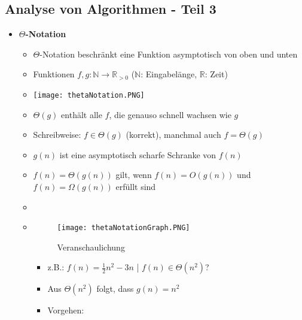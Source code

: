\subsection{Analyse von Algorithmen - Teil 3}
    \begin{itemize}
        \item \textbf{$\Theta$-Notation}
            \begin{itemize}
                \item $\Theta$-Notation beschränkt eine Funktion asymptotisch von oben und unten
                \item Funktionen $f,g: \mathbb{N} \rightarrow \mathbb{R}_{>0}$ ($\mathbb{N}$: Eingabelänge, $\mathbb{R}$: Zeit)
                \item[] \texttt{[image: thetaNotation.PNG]}
                \item $\Theta(g)$ enthält alle $f$, die genauso schnell wachsen wie $g$
                \item Schreibweise: $f \in \Theta(g)$ (korrekt), manchmal auch $f = \Theta(g)$
                \item $g(n)$ ist eine asymptotisch scharfe Schranke von $f(n)$
                \item $f(n)= \Theta(g(n))$ gilt, wenn $f(n) = O(g(n))$ und $f(n)=\Omega(g(n))$ erfüllt sind
                \item[]
                \item[] 
                    \begin{minipage}{0.3\textwidth}
                    \begin{figure}[H]
                        \centering
                        \texttt{[image: thetaNotationGraph.PNG]}
                        \caption{Veranschaulichung}
                        \label{}
                    \end{figure}
                    \end{minipage}
                    \begin{minipage}[t]{0.6\textwidth}
                    \vspace{-3cm}
                        \begin{itemize}
                            \item z.B.: $f(n)= \frac{1}{2} n^2 - 3n$ | $f(n) \in \Theta(n^2)$?
                            \item Aus $\Theta(n^2)$ folgt, dass $g(n)=n^2$
                            \item Vorgehen:
                                \begin{itemize}

\end{itemize}
\end{itemize}
\end{minipage}
\end{itemize}
\end{itemize}
